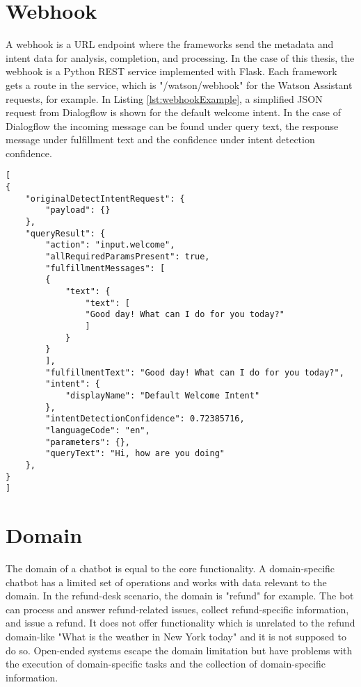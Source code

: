 \section{Webhook} \label{sec:webhook}
A webhook is a URL endpoint where the frameworks send the metadata and intent data for analysis, completion, and processing.
In the case of this thesis, the webhook is a Python REST service implemented with Flask.
Each framework gets a route in the service, which is "/watson/webhook" for the Watson Assistant requests, for example.
In Listing \ref{lst:webhookExample}, a simplified JSON request from Dialogflow is shown for the default welcome intent.
In the case of Dialogflow the incoming message can be found under query text, the response message under fulfillment text and the confidence under intent detection confidence. 
\begin{lstlisting}[caption={Dialogflow Webhook Request Example}, label={lst:webhookExample},captionpos=b,frame=single,language={[Sharp]C},commentstyle=\color{mygreen},keywordstyle=\color{blue},
morekeywords={}]                
[
{
    "originalDetectIntentRequest": {
        "payload": {}
    },
    "queryResult": {
        "action": "input.welcome",
        "allRequiredParamsPresent": true,
        "fulfillmentMessages": [
        {
            "text": {
                "text": [
                "Good day! What can I do for you today?"
                ]
            }
        }
        ],
        "fulfillmentText": "Good day! What can I do for you today?",
        "intent": {
            "displayName": "Default Welcome Intent"
        },
        "intentDetectionConfidence": 0.72385716,
        "languageCode": "en",
        "parameters": {},
        "queryText": "Hi, how are you doing"
    },
}
]\end{lstlisting}  


\section{Domain}
The domain of a chatbot is equal to the core functionality.
A domain-specific chatbot has a limited set of operations and works with data relevant to the domain.
In the refund-desk scenario, the domain is "refund" for example.
The bot can process and answer refund-related issues, collect refund-specific information, and issue a refund. 
It does not offer functionality which is unrelated to the refund domain-like 
"What is the weather in New York today" and it is not supposed to do so.
Open-ended systems escape the domain limitation but have problems with the execution of domain-specific tasks and the collection of domain-specific information. 

